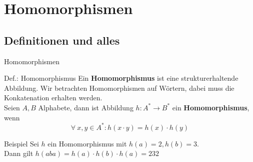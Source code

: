 \section{Homomorphismen}

	

\subsection{Definitionen und alles}
\begin{frame}{Homomorphismen}
	\begin{block}{Def.: Homomorphismus}
		Ein \textbf{Homomorphismus} ist eine strukturerhaltende Abbildung. Wir betrachten Homomorphismen auf Wörtern, dabei muss die Konkatenation erhalten werden.\\
		Seien $A, B$ Alphabete, dann ist Abbildung $h: A^* \to B^*$ ein \textbf{Homomorphismus}, wenn
		$$ \forall\ x, y\in A^* : h(x \cdot y) = h(x) \cdot h(y) $$
	\end{block}
	
	\begin{exampleblock}{Beispiel}
		Sei $h$ ein Homomorphismus mit $h(a) = 2, h(b) = 3$. \\
		Dann gilt $h(aba) = h(a) \cdot h(b) \cdot h(a) = 232 $
	\end{exampleblock}
\end{frame}


